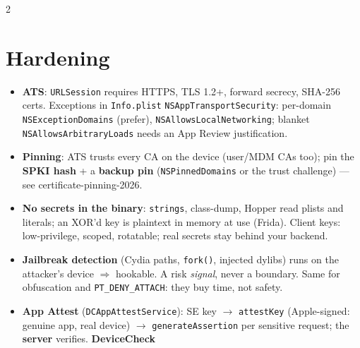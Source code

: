 \documentclass[8pt]{extarticle}
\begin{document}



\begin{multicols}{2}
\raggedright

\section{Hardening}
\begin{itemize}
  \item \textbf{ATS}: \texttt{URLSession} requires HTTPS, TLS 1.2+, forward
        secrecy, SHA-256 certs. Exceptions in \texttt{Info.plist}
        \texttt{NSAppTransportSecurity}: per-domain
        \texttt{NSExceptionDomains} (prefer), \texttt{NSAllowsLocalNetworking};
        blanket \texttt{NSAllowsArbitraryLoads} needs an App Review
        justification.
  \item \textbf{Pinning}: ATS trusts every CA on the device (user/MDM CAs
        too); pin the \textbf{SPKI hash} + a \textbf{backup pin}
        (\texttt{NSPinnedDomains} or the trust challenge) — see
        certificate-pinning-2026.
  \item \textbf{No secrets in the binary}: \texttt{strings}, class-dump,
        Hopper read plists and literals; an XOR'd key is plaintext in memory
        at use (Frida). Client keys: low-privilege, scoped, rotatable; real
        secrets stay behind your backend.
  \item \textbf{Jailbreak detection} (Cydia paths, \texttt{fork()},
        injected dylibs) runs on the attacker's device $\Rightarrow$ hookable.
        A risk \emph{signal}, never a boundary. Same for obfuscation and
        \texttt{PT\_DENY\_ATTACH}: they buy time, not safety.
  \item \textbf{App Attest} (\texttt{DCAppAttestService}): SE key
        $\to$ \texttt{attestKey} (Apple-signed: genuine app, real device)
        $\to$ \texttt{generateAssertion} per sensitive request; the
        \textbf{server} verifies. \textbf{DeviceCheck}

\end{itemize}
\end{multicols}
\end{document}
